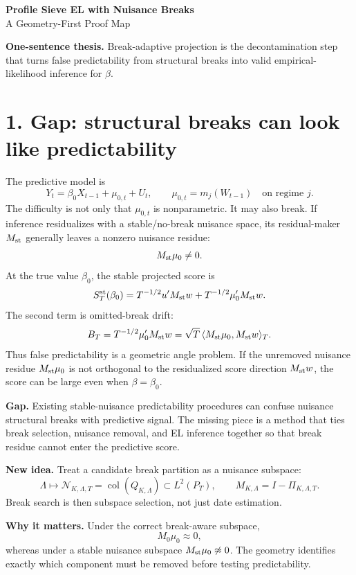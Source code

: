 \documentclass[11pt]{article}
\newcommand{\innerT}[2]{\langle #1,#2\rangle_T}
\newcommand{\N}{\mathcal N}
\begin{document}
\begin{center}
{\Large\bf Profile Sieve EL with Nuisance Breaks}\\[-1pt]
{\large A Geometry-First Proof Map}\\[-1pt]
\end{center}

\vspace{-4pt}
\textbf{One-sentence thesis.}
Break-adaptive projection is the decontamination step that turns false
predictability from structural breaks into valid empirical-likelihood inference
for \(\beta\).

\section*{1. Gap: structural breaks can look like predictability}

The predictive model is
\[
    Y_t=\beta_0X_{t-1}+\mu_{0,t}+U_t,\qquad
    \mu_{0,t}=m_j(W_{t-1})\quad\text{on regime }j .
\]
The difficulty is not only that \(\mu_{0,t}\) is nonparametric. It may also
break. If inference residualizes with a stable/no-break nuisance space, its
residual-maker \(M_{\rm st}\) generally leaves a nonzero nuisance residue:
\[
    M_{\rm st}\mu_0\neq0 .
\]
At the true value \(\beta_0\), the stable projected score is
\[
    S_T^{\rm st}(\beta_0)
    =
    T^{-1/2}u'M_{\rm st}w
    +
    T^{-1/2}\mu_0'M_{\rm st}w .
\]
The second term is omitted-break drift:
\[
    B_T
    =
    T^{-1/2}\mu_0'M_{\rm st}w
    =
    \sqrt T\,\innerT{M_{\rm st}\mu_0}{M_{\rm st}w}.
\]
Thus false predictability is a geometric angle problem. If the unremoved
nuisance residue \(M_{\rm st}\mu_0\) is not orthogonal to the residualized score
direction \(M_{\rm st}w\), the score can be large even when \(\beta=\beta_0\).

\textbf{Gap.} Existing stable-nuisance predictability procedures can confuse
nuisance structural breaks with predictive signal. The missing piece is a
method that ties break selection, nuisance removal, and EL inference together
so that break residue cannot enter the predictive score.

\textbf{New idea.} Treat a candidate break partition as a nuisance subspace:
\[
    \Lambda\longmapsto
    \N_{K,\Lambda,T}=\operatorname{col}(Q_{K,\Lambda})\subset L^2(P_T),
    \qquad
    M_{K,\Lambda}=I-\Pi_{K,\Lambda,T}.
\]
Break search is then subspace selection, not just date estimation.

\textbf{Why it matters.} Under the correct break-aware subspace,
\[
    M_0\mu_0\approx0,
\]
whereas under a stable nuisance subspace \(M_{\rm st}\mu_0\not\approx0\). The
geometry identifies exactly which component must be removed before testing
predictability.
\end{document}
